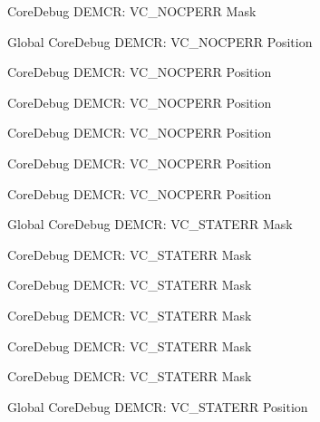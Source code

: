 \begin{DoxyRefList}
\label{deprecated__deprecated000210}%
%
Core\+Debug DEMCR\+: VC\+\_\+\+NOCPERR Mask  
\item[Global \doxylink{group___c_m_s_i_s___core_debug_gac9d13eb2add61f610d5ced1f7ad2adf8}{Core\+Debug\+\_\+\+DEMCR\+\_\+\+VC\+\_\+\+NOCPERR\+\_\+\+Pos} ]\label{deprecated__deprecated000065}%
%
Core\+Debug DEMCR\+: VC\+\_\+\+NOCPERR Position 

\label{deprecated__deprecated000618}%
%
Core\+Debug DEMCR\+: VC\+\_\+\+NOCPERR Position 

\label{deprecated__deprecated000516}%
%
Core\+Debug DEMCR\+: VC\+\_\+\+NOCPERR Position 

\label{deprecated__deprecated000427}%
%
Core\+Debug DEMCR\+: VC\+\_\+\+NOCPERR Position 

\label{deprecated__deprecated000209}%
%
Core\+Debug DEMCR\+: VC\+\_\+\+NOCPERR Position 

\label{deprecated__deprecated000351}%
%
Core\+Debug DEMCR\+: VC\+\_\+\+NOCPERR Position  
\item[Global \doxylink{group___c_m_s_i_s___core_debug_gaa38b947d77672c48bba1280c0a642e19}{Core\+Debug\+\_\+\+DEMCR\+\_\+\+VC\+\_\+\+STATERR\+\_\+\+Msk} ]\label{deprecated__deprecated000062}%
%
Core\+Debug DEMCR\+: VC\+\_\+\+STATERR Mask 

\label{deprecated__deprecated000615}%
%
Core\+Debug DEMCR\+: VC\+\_\+\+STATERR Mask 

\label{deprecated__deprecated000513}%
%
Core\+Debug DEMCR\+: VC\+\_\+\+STATERR Mask 

\label{deprecated__deprecated000424}%
%
Core\+Debug DEMCR\+: VC\+\_\+\+STATERR Mask 

\label{deprecated__deprecated000206}%
%
Core\+Debug DEMCR\+: VC\+\_\+\+STATERR Mask 

\label{deprecated__deprecated000348}%
%
Core\+Debug DEMCR\+: VC\+\_\+\+STATERR Mask  
\item[Global \doxylink{group___c_m_s_i_s___core_debug_ga16f0d3d2ce1e1e8cd762d938ac56c4ac}{Core\+Debug\+\_\+\+DEMCR\+\_\+\+VC\+\_\+\+STATERR\+\_\+\+Pos} ]\label{deprecated__deprecated000205}%
%
Core\+Debug DEMCR\+: VC\+\_\+\+STATERR Position 


\end{DoxyRefList}
